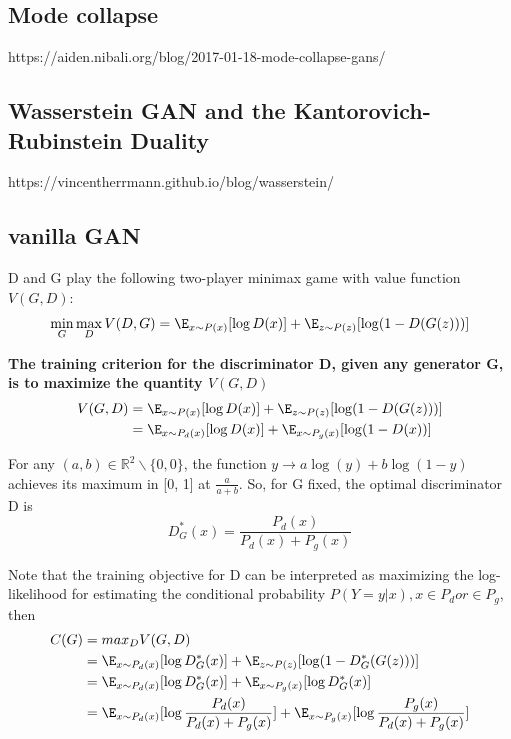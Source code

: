 \subsection{Mode collapse}
https://aiden.nibali.org/blog/2017-01-18-mode-collapse-gans/

\subsection{Wasserstein GAN and the Kantorovich-Rubinstein Duality}
https://vincentherrmann.github.io/blog/wasserstein/

\subsection{vanilla GAN}
D and G play the following two-player minimax game with value function $V(G,D)$:
\begin{equation}
    \min_G \max_D V(D, G)
    = \E_{x \sim P(x)}[\log D(x)] + \E_{z \sim P(z)}[\log (1 - D(G(z)))]
\end{equation}

\textbf{The training criterion for the discriminator D, given any generator G, is to maximize the
quantity $V(G, D)$}
\begin{equation}
    \begin{split}
        V(G, D)
        &= \E_{x \sim P(x)}[\log D(x)] + \E_{z \sim P(z)}[\log (1 - D(G(z)))] \\
        &= \E_{x \sim P_d(x)}[\log D(x)] + \E_{x \sim P_g(x)}[\log (1 - D(x))]
    \end{split}
\end{equation}

For any $(a, b) \in \mathbb{R}^2 \backslash \{0, 0\}$, the function $ y \to a\log(y) + b\log(1 - y)$
achieves its maximum in [0, 1] at $\frac{a}{a + b}$.
So, for G fixed, the optimal discriminator D is
\begin{equation}
    D_{G}^{*}(x) = \frac{P_d(x)}{P_d(x) + P_g(x)}
\end{equation}

Note that the training objective for D can be interpreted as maximizing the log-likelihood for
estimating the conditional probability $P(Y = y|x), x \in P_d or \in P_g$, then
\begin{equation}
    \begin{split}
        C(G) &= max_D V(G, D) \\
        &= \E_{x \sim P_d(x)}[\log D_G^*(x)] + \E_{z \sim P(z)}[\log(1 - D_G^*(G(z)))] \\
        &= \E_{x \sim P_d(x)}[\log D_G^*(x)] + \E_{x \sim P_g(x)}[\log D_G^*(x)] \\
        &= \E_{x \sim P_d(x)}[\log \frac{P_d(x)}{P_d(x) + P_g(x)}] + \E_{x \sim P_g(x)}[\log \frac{P_g(x)}{P_d(x) + P_g(x)}]
    \end{split}
\end{equation}

